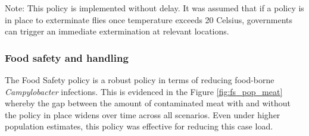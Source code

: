 Note: This policy is implemented without delay. It was assumed that if a policy is in place to exterminate flies once temperature exceeds 20 \degree Celsius, governments can trigger an immediate extermination at relevant locations.

\subsubsection{Food safety and handling}
\label{sec: food safety}
The Food Safety policy is a robust policy in terms of reducing food-borne \textit{Campylobacter} infections. This is evidenced in the Figure \ref{fig:fs_pop_meat}
whereby the gap between the amount of contaminated meat with and without the policy in place widens over time across all scenarios. Even under higher population estimates, this policy was effective for reducing this case load.

